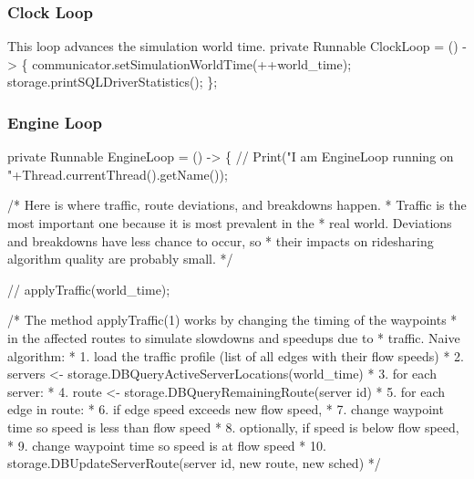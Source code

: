 \documentclass{article}
\def\nwendcode{\endtrivlist \endgroup}      %
\let\nwdocspar=\par
\begin{document}
\subsubsection{Clock Loop}
This loop advances the simulation world time.
\nwenddocs{}\endmoddef{}
private Runnable ClockLoop = () -> \{
  communicator.setSimulationWorldTime(++world_time);
  storage.printSQLDriverStatistics();
\};
\eatline
{}\nwendcode{}\nwdocspar
\subsubsection{Engine Loop}
\nwenddocs{}\endmoddef{}
private Runnable EngineLoop = () -> \{
  // Print("I am EngineLoop running on "+Thread.currentThread().getName());

  /* Here is where traffic, route deviations, and breakdowns happen.
   * Traffic is the most important one because it is most prevalent in the
   * real world. Deviations and breakdowns have less chance to occur, so
   * their impacts on ridesharing algorithm quality are probably small.
   */

  // applyTraffic(world_time);

  /* The method applyTraffic(1) works by changing the timing of the waypoints
   * in the affected routes to simulate slowdowns and speedups due to
   * traffic. Naive algorithm:
   *   1. load the traffic profile (list of all edges with their flow speeds)
   *   2. servers <- storage.DBQueryActiveServerLocations(world_time)
   *   3. for each server:
   *   4.   route <- storage.DBQueryRemainingRoute(server id)
   *   5.   for each edge in route:
   *   6.     if edge speed exceeds new flow speed,
   *   7.       change waypoint time so speed is less than flow speed
   *   8.     optionally, if speed is below flow speed,
   *   9.       change waypoint time so speed is at flow speed
   *  10.   storage.DBUpdateServerRoute(server id, new route, new sched)
   */
\end{document}
